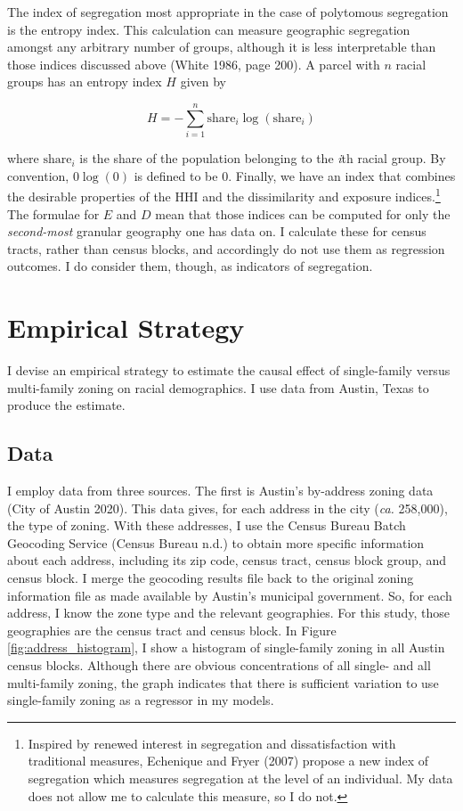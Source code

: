 \documentclass[11pt]{article}
\begin{document}
The index of segregation most appropriate in the case of polytomous segregation is the entropy index. This calculation can measure geographic segregation amongst any arbitrary number of groups, although it is less interpretable than those indices discussed above (White 1986, page 200). A parcel with $n$ racial groups has an entropy index $H$ given by

\begin{equation}
    H=-\sum_{i=1}^n\text{share}_i \log(\text{share}_i)
\end{equation}

\noindent where $\text{share}_i$ is the share of the population belonging to the \textit{i}th racial group. By convention, $0\log(0)$ is defined to be $0$. Finally, we have an index that combines the desirable properties of the HHI and the dissimilarity and exposure indices.\footnote{Inspired by renewed interest in segregation and dissatisfaction with traditional measures, Echenique and Fryer (2007) propose a new index of segregation which measures segregation at the level of an individual. My data does not allow me to calculate this measure, so I do not.} The formulae for $E$ and $D$ mean that those indices can be computed for only the \textit{second-most} granular geography one has data on. I calculate these for census tracts, rather than census blocks, and accordingly do not use them as regression outcomes. I do consider them, though, as indicators of segregation.


\section{Empirical Strategy}
I devise an empirical strategy to estimate the causal effect of single-family versus multi-family zoning on racial demographics. I use data from Austin, Texas to produce the estimate.

\subsection{Data}
I employ data from three sources. The first is Austin’s by-address zoning data (City of Austin 2020). This data gives, for each address in the city (\textit{ca.} 258,000), the type of zoning. With these addresses, I use the Census Bureau Batch Geocoding Service (Census Bureau n.d.) to obtain more specific information about each address, including its zip code, census tract, census block group, and census block. I merge the geocoding results file back to the original zoning information file as made available by Austin’s municipal government. So, for each address, I know the zone type and the relevant geographies. For this study, those geographies are the census tract and census block. In Figure \ref{fig:address_histogram}, I show a histogram of single-family zoning in all Austin census blocks. Although there are obvious concentrations of all single- and all multi-family zoning, the graph indicates that there is sufficient variation to use single-family zoning as a regressor in my models.
\end{document}
